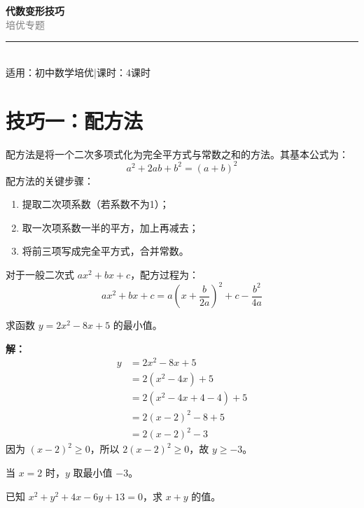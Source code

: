 \documentclass[12pt, a4paper]{ctexart}
\begin{document}
\begin{center}
{\Huge\bfseries\textcolor{mainblue}{代数变形技巧}}\\[12pt]
{\Large\textcolor{gray}{培\quad 优\quad 专\quad 题}}\\[8pt]
\rule{0.6\textwidth}{1pt}\\[8pt]
{\normalsize 适用：初中数学培优\quad |\quad 课时：4课时}
\end{center}
\vspace{10pt}

\section*{\textcolor{mainblue}{技巧一：配方法}}

\begin{knowledgebox}[配方法的核心思想]
配方法是将一个二次多项式化为完全平方式与常数之和的方法。其基本公式为：
\[
a^2 + 2ab + b^2 = (a+b)^2
\]
配方法的关键步骤：
\begin{enumerate}[leftmargin=2em]
  \item 提取二次项系数（若系数不为1）；
  \item 取一次项系数一半的平方，加上再减去；
  \item 将前三项写成完全平方式，合并常数。
\end{enumerate}
对于一般二次式 $ax^2+bx+c$，配方过程为：
\[
ax^2+bx+c = a\left(x+\frac{b}{2a}\right)^2 + c - \frac{b^2}{4a}
\]
\end{knowledgebox}

\begin{examplebox}[【例1】配方求最值]
求函数 $y = 2x^2 - 8x + 5$ 的最小值。
\end{examplebox}

\textbf{解：}
\begin{align*}
y &= 2x^2 - 8x + 5 \\
  &= 2(x^2 - 4x) + 5 \\
  &= 2(x^2 - 4x + 4 - 4) + 5 \\
  &= 2(x-2)^2 - 8 + 5 \\
  &= 2(x-2)^2 - 3
\end{align*}
因为 $(x-2)^2 \geqslant 0$，所以 $2(x-2)^2 \geqslant 0$，故 $y \geqslant -3$。

当 $x=2$ 时，$y$ 取最小值 $\boxed{-3}$。

\begin{examplebox}[【例2】配方化简求值]
已知 $x^2 + y^2 + 4x - 6y + 13 = 0$，求 $x+y$ 的值。
\end{examplebox}
\end{document}
